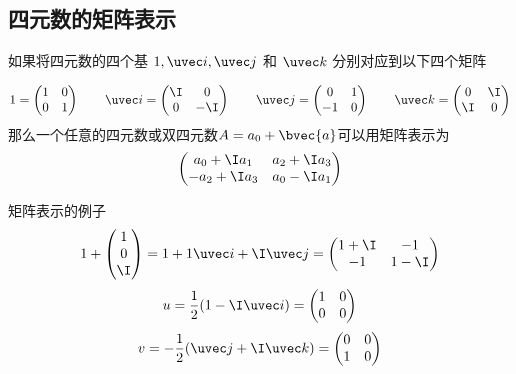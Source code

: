 \subsection{四元数的矩阵表示}

如果将四元数的四个基 $1, \uvec i, \uvec j$ 和 $\uvec k$ 分别对应到以下四个矩阵

\begin{equation}
1=\begin{pmatrix}1&0\\0&1\end{pmatrix} 
\qquad
\uvec i=\begin{pmatrix}\I&0\\0&-\I\end{pmatrix} 
\qquad
\uvec j=\begin{pmatrix}0&1\\-1&0\end{pmatrix} 
\qquad
\uvec k=\begin{pmatrix}0&\I\\\I&0\end{pmatrix} 
\end{equation}
那么一个任意的四元数或双四元数$A=a_0+\bvec{a}$可以用矩阵表示为
\begin{equation}
\begin{pmatrix}a_0+\I a_1&a_2+\I a_3\\-a_2+\I a_3&a_0-\I a_1 \end{pmatrix} 
\end{equation}

\begin{example}{矩阵表示的例子}\label{QuaRot_ex1}
\begin{equation}
1+\begin{pmatrix}1\\0\\\I\end{pmatrix} =1+1\uvec i+\I\uvec j =\begin{pmatrix}1+\I&-1\\-1&1-\I\end{pmatrix} 
\end{equation}
\begin{equation}
u=\frac{1}{2}(1-\I\uvec i)=\begin{pmatrix}1&0\\0&0\end{pmatrix} 
\end{equation}
\begin{equation}
v=-\frac{1}{2}(\uvec j+\I\uvec k)=\begin{pmatrix}0&0\\1&0\end{pmatrix} 
\end{equation}
\end{example}

